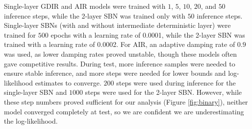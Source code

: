 \documentclass{article} %
\begin{document}
Single-layer GDIR and AIR models were trained with $1$, $5$, $10$, $20$, and $50$ inference steps, while the 2-layer SBN was trained only with $50$ inference steps. Single-layer SBNs (with and without intermediate deterministic layer) were trained for $500$ epochs with a learning rate of \num{0.0001}, while the 2-layer SBN was trained with a learning rate of \num{0.0002}. For AIR, an
adaptive damping rate of $0.9$ was used, as lower damping rates proved unstable, though these models often gave competitive results.
During test, more inference samples were needed to ensure stable inference, and more steps were needed for lower bounds and log-likelihood estimates to converge. $200$ steps were used during inference for the single-layer SBN and $1000$ steps were used for the 2-layer SBN. However, while these step numbers proved sufficient for our analysis (Figure \ref{fig:binary}), neither model converged completely at test, so we are confident we are underestimating the log-likelihood. 
\end{document}

